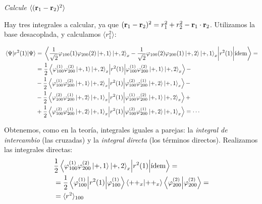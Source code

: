 \begin{tcolorbox}[halign=left]
  \emph{Calcule $\langle (\bm{\mathrm{r}}_1-\bm{\mathrm{r}}_2)^2\rangle$}
\end{tcolorbox}
Hay tres integrales a calcular, ya que $(\bm{\mathrm{r}}_1-\bm{\mathrm{r}}_2)^2
= r_1^2 + r_2^2 - \bm{\mathrm{r}}_1 \cdot\bm{\mathrm{r}}_2$. Utilizamos la base
desacoplada, y calculamos $\langle r_1^2\rangle$:
\begin{fullwidth}
  \begin{equation}
    \begin{split}
      \mel{\Psi}{r^2(1)}{\Psi} &= \mel{ \frac{1}{\sqrt{2}}
        \varphi_{100}(1)\varphi_{200}(2)\ket{+,1}\ket{+,2}_x
        - \frac{1}{\sqrt{2}}
        \varphi_{100}(2)\varphi_{200}(1)\ket{+,2}\ket{+,1}_x
      }{r^2(1)}{\text{ídem}} = \\
      &= \frac{1}{2}\mel{
        \varphi_{100}^{(1)}\varphi_{200}^{(2)}\ket{+,1}\ket{+,2}_x}{r^2(1)}{
        \varphi_{100}^{(1)}\varphi_{200}^{(2)}\ket{+,1}\ket{+,2}_x} -\\
      &- \frac{1}{2} \mel{
        \varphi_{100}^{(1)}\varphi_{200}^{(2)}\ket{+,1}\ket{+,2}_x}{r^2(1)}{
        \varphi_{100}^{(2)}\varphi_{200}^{(1)}\ket{+,2}\ket{+,1}_x} -\\
      &- \frac{1}{2} \mel{
        \varphi_{100}^{(2)}\varphi_{200}^{(1)}\ket{+,2}\ket{+,1}_x}{r^2(1)}{
        \varphi_{100}^{(1)}\varphi_{200}^{(2)}\ket{+,1}\ket{+,2}_x} +\\
      &+ \frac{1}{2}\mel{
        \varphi_{100}^{(2)}\varphi_{200}^{(1)}\ket{+,2}\ket{+,1}_x}{r^2(1)}{
        \varphi_{100}^{(2)}\varphi_{200}^{(1)}\ket{+,2}\ket{+,1}_x} = \cdots
    \end{split}
  \end{equation}
\end{fullwidth}
Obtenemos, como en la teoría, integrales iguales a parejas: la
\emph{integral de intercambio} (las cruzadas) y la \emph{integral
  directa} (los términos directos). Realizamos las integrales directas:
\begin{equation}
  \begin{split}
    &\frac{1}{2}\mel{
      \varphi_{100}^{(1)}\varphi_{200}^{(2)}\ket{+,1}\ket{+,2}_x}{r^2(1)}{\text{ídem}}
    = \\
    &= \frac{1}{2}
    \mel{\varphi_{100}^{(1)}}{r^2(1)}{\varphi_{100}^{(1)}}\braket{++_x}{++_x}\braket{\varphi_{200}^{(2)}}{\varphi_{200}^{(2)}}
    = \\
    &= \langle r^2\rangle_{100}
  \end{split}
\end{equation}
